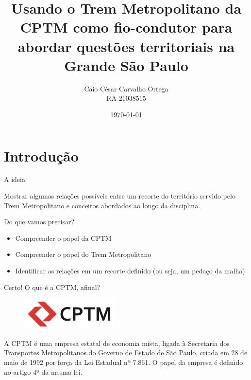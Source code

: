 \documentclass[spectratio=169, portuguese]{beamer}
\title{Usando o Trem Metropolitano da CPTM como fio-condutor para abordar questões territoriais na Grande São Paulo}
\author{
	Caio César Carvalho Ortega \\
	RA 21038515
	}
\date{\today}
\begin{document}
\begin{frame}
\titlepage
\end{frame}
%
%

\section{Introdução}
\begin{frame}{A ideia}
	
	Mostrar algumas relações possíveis entre um recorte do território servido pelo Trem Metropolitano e conceitos abordados ao longo da disciplina.

\end{frame}
\begin{frame}{Do que vamos precisar?}

	\begin{itemize}
		\item Compreender o papel da CPTM
		\item Compreender o papel do Trem Metropolitano
		\item Identificar as relações em um recorte definido (ou seja, um pedaço da malha)
	\end{itemize}

\end{frame}


\begin{frame}{Certo! O que é a CPTM, afinal?}
	
	\begin{figure}[h]
		\includegraphics[keepaspectratio,width=5cm]{beamer/cptm_logotipo.png}
	\end{figure}
	
	A CPTM é uma empresa estatal de economia mista, ligada à Secretaria dos Transportes Metropolitanos do Governo de Estado de São Paulo, criada em 28 de maio de 1992 por força da Lei Estadual nº 7.861\cite{sitecptm1}. O papel da empresa é definido no artigo 4º da mesma lei.
	
\end{frame}

\end{document}
